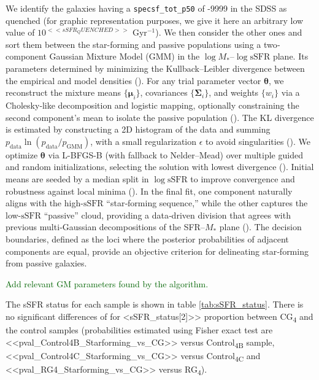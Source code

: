 \documentclass{aa}
\newcommand{\CB}{Control\textsubscript{4B}}
\newcommand{\CC}{Control\textsubscript{4C}}
\newcommand{\CG}{CG\textsubscript{4}}
\newcommand{\RG}{RG\textsubscript{4}}
\newcommand{\mt}[1]{\textcolor{darkgreen}{#1}}
\begin{document}
We identify the galaxies having a \texttt{specsf\_tot\_p50} of -9999 in the SDSS as quenched 
(for graphic representation purposes, we give it here an arbitrary low value of $10^{<<sSFR_QUENCHED>>}$ Gyr\(^{-1}\)).
We then consider the other ones and sort them between the 
star-forming and passive populations using a two‐component Gaussian Mixture Model (GMM) in the \(\log M_*\)–\(\log\mathrm{sSFR}\) plane.
Its parameters determined by minimizing the Kullback–Leibler divergence between the empirical and model densities 
(\cite{Kullback1951,McLachlanPeel2000}). For any trial parameter vector \(\boldsymbol{\theta}\), we reconstruct the mixture means 
\(\{\boldsymbol{\mu}_i\}\), covariances \(\{\mathbf{\Sigma}_i\}\), and weights \(\{w_i\}\) via a Cholesky‐like decomposition and 
logistic mapping, optionally constraining the second component’s mean to isolate the passive population (\cite{Dempster1977}). 
The KL divergence is estimated by constructing a 2D histogram of the data and summing \(p_\mathrm{data}\ln(p_\mathrm{data}/p_\mathrm{GMM})\), 
with a small regularization \(\epsilon\) to avoid singularities (\cite{Tojeiro2009,Bisigello2018}). We optimize \(\boldsymbol{\theta}\) 
via L-BFGS-B (with fallback to Nelder–Mead) over multiple guided and random initializations, selecting the solution with lowest divergence 
(\cite{Pedregosa2011,Bishop2006}). Initial means are seeded by a median split in \(\log\mathrm{sSFR}\) to improve convergence and robustness 
against local minima (\cite{Rousseeuw1987}). In the final fit, one component naturally aligns with the high-\(\mathrm{sSFR}\) “star‐forming 
sequence,” while the other captures the low-\(\mathrm{sSFR}\) “passive” cloud, providing a data‐driven division that agrees with previous 
multi‐Gaussian decompositions of the SFR–\(M_*\) plane (\cite{Wuyts2011,Hahn2019}). The decision boundaries, defined as the 
loci where the posterior probabilities of adjacent components are equal, provide an objective criterion for 
delineating star‐forming from passive galaxies.

\mt{Add relevant GM parameters found by the algorithm.}

The sSFR status for each sample is shown in table \ref{tab:sSFR_status}. There is no significant differences of for \<<sSFR_status[2]>>{} proportion 
between \CG{} and the control samples (probabilities estimated using Fisher exact test are  
<<pval_Control4B_Starforming_vs_CG>>  versus \CB{} sample, 
 <<pval_Control4C_Starforming_vs_CG>>  versus \CC{} and  <<pval_RG4_Starforming_vs_CG>>  versus \RG).
\end{document}
